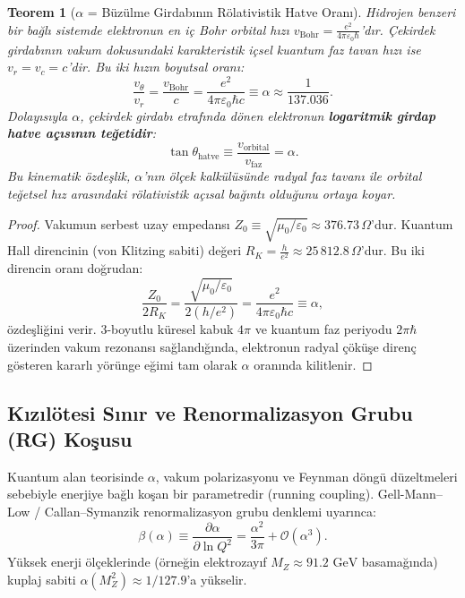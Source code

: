 \documentclass[11pt,a4paper]{article}
\newtheorem{theorem}{Teorem}[section]
\begin{document}
\begin{theorem}[$\alpha$ = Büzülme Girdabının Rölativistik Hatve Oranı]
    \label{thm:alpha_spiral_hatve_p2}
    Hidrojen benzeri bir bağlı sistemde elektronun en iç Bohr orbital hızı $v_{\mathrm{Bohr}} = \frac{e^2}{4\pi \varepsilon_0 \hbar}$'dır. Çekirdek girdabının vakum dokusundaki karakteristik içsel kuantum faz tavan hızı ise $v_r = v_c = c$'dir. Bu iki hızın boyutsal oranı:
    \begin{equation}
        \frac{v_\theta}{v_r} = \frac{v_{\mathrm{Bohr}}}{c} = \frac{e^2}{4\pi \varepsilon_0 \hbar c} \equiv \alpha \approx \frac{1}{137.036}.
        \label{eq:alpha_spiral_ispat}
    \end{equation}
    Dolayısıyla $\alpha$, çekirdek girdabı etrafında dönen elektronun \textbf{logaritmik girdap hatve açısının teğetidir}:
    \begin{equation}
        \tan \theta_{\mathrm{hatve}} \equiv \frac{v_{\mathrm{orbital}}}{v_{\mathrm{faz}}} = \alpha.
        \label{eq:hatve_tanim}
    \end{equation}
    Bu kinematik özdeşlik, $\alpha$'nın ölçek kalkülüsünde radyal faz tavanı ile orbital teğetsel hız arasındaki rölativistik açısal bağıntı olduğunu ortaya koyar.
\end{theorem}

\begin{proof}
    Vakumun serbest uzay empedansı $Z_0 \equiv \sqrt{\mu_0/\varepsilon_0} \approx 376.73\,\Omega$'dur. Kuantum Hall direncinin (von Klitzing sabiti) değeri $R_K = \frac{h}{e^2} \approx 25\,812.8\,\Omega$'dur. Bu iki direncin oranı doğrudan:
    \begin{equation}
        \frac{Z_0}{2 R_K} = \frac{\sqrt{\mu_0/\varepsilon_0}}{2 (h/e^2)} = \frac{e^2}{4\pi \varepsilon_0 \hbar c} \equiv \alpha,
    \end{equation}
    özdeşliğini verir. 3-boyutlu küresel kabuk $4\pi$ ve kuantum faz periyodu $2\pi\hbar$ üzerinden vakum rezonansı sağlandığında, elektronun radyal çöküşe direnç gösteren kararlı yörünge eğimi tam olarak $\alpha$ oranında kilitlenir.
\end{proof}

\subsection{Kızılötesi Sınır ve Renormalizasyon Grubu (RG) Koşusu}
\label{sec:rg_kosu}

Kuantum alan teorisinde $\alpha$, vakum polarizasyonu ve Feynman döngü düzeltmeleri sebebiyle enerjiye bağlı koşan bir parametredir (running coupling). Gell-Mann--Low / Callan--Symanzik renormalizasyon grubu denklemi uyarınca:
\begin{equation}
    \beta(\alpha) \equiv \frac{\partial \alpha}{\partial \ln Q^2} = \frac{\alpha^2}{3\pi} + \mathcal{O}(\alpha^3).
    \label{eq:gell_mann_low}
\end{equation}
Yüksek enerji ölçeklerinde (örneğin elektrozayıf $M_Z \approx 91.2\text{ GeV}$ basamağında) kuplaj sabiti $\alpha(M_Z^2) \approx 1/127.9$'a yükselir.
\end{document}
